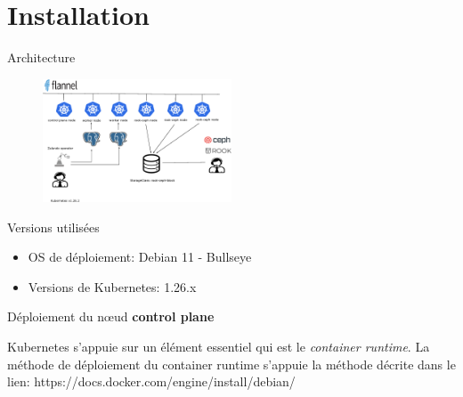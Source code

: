 \section{Installation}


\begin{frame}[fragile]{Architecture}

\begin{figure}
\begin{center}
\includegraphics[angle=0, width=0.5\textwidth]{images/architecture.eps}
\end{center}
\end{figure}

\end{frame}


\begin{frame}[fragile]{Versions utilisées}

   \begin{itemize}
      \item OS de déploiement: Debian 11 - Bullseye
      \item Versions de Kubernetes: 1.26.x
   \end{itemize}

\end{frame}


\begin{frame}[fragile]{Déploiement du n{\oe}ud \textbf{control plane}}

   Kubernetes s'appuie sur un élément essentiel qui est le \textit{container runtime}.
   La méthode de déploiement du container runtime s'appuie la méthode décrite dans le lien: https://docs.docker.com/engine/install/debian/

\end{frame}

